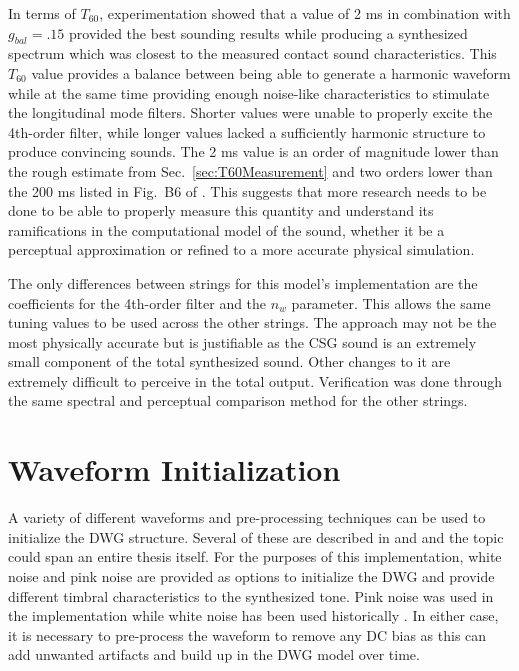 \documentclass[../main.tex]{subfiles}
\begin{document}
In terms of $T_{60}$, experimentation showed that a value of 2 ms in combination with $g_{bal} = .15$ provided the best sounding results while producing a synthesized spectrum which was closest to the measured contact sound characteristics. This $T_{60}$ value provides a balance between being able to generate a harmonic waveform while at the same time providing enough noise-like characteristics to stimulate the longitudinal mode filters. Shorter values were unable to properly excite the 4th-order filter, while longer values lacked a sufficiently harmonic structure to produce convincing sounds. The 2 ms value is an order of magnitude lower than the rough estimate from Sec.~\ref{sec:T60Measurement} and two orders lower than the 200 ms listed in Fig.~B6 of . This suggests that more research needs to be done to be able to properly measure this quantity and understand its ramifications in the computational model of the sound, whether it be a perceptual approximation or refined to a more accurate physical simulation. 

The only differences between strings for this model's implementation are the coefficients for the 4th-order filter and the $n_w$ parameter. This allows the same tuning values to be used across the other strings. The approach may not be the most physically accurate but is justifiable as the CSG sound is an extremely small component of the total synthesized sound. Other changes to it are extremely difficult to perceive in the total output. Verification was done through the same spectral and perceptual comparison method for the other strings.

\section{Waveform Initialization}
\label{sec:Ch6WaveformInit}
A variety of different waveforms and pre-processing techniques can be used to initialize the DWG structure. Several of these are described in  and  and the topic could span an entire thesis itself. For the purposes of this implementation, white noise and pink noise are provided as options to initialize the DWG and provide different timbral characteristics to the synthesized tone. Pink noise was used in the  implementation while white noise has been used historically . In either case, it is necessary to pre-process the waveform to remove any DC bias as this can add unwanted artifacts and build up in the DWG model over time.
\end{document}
